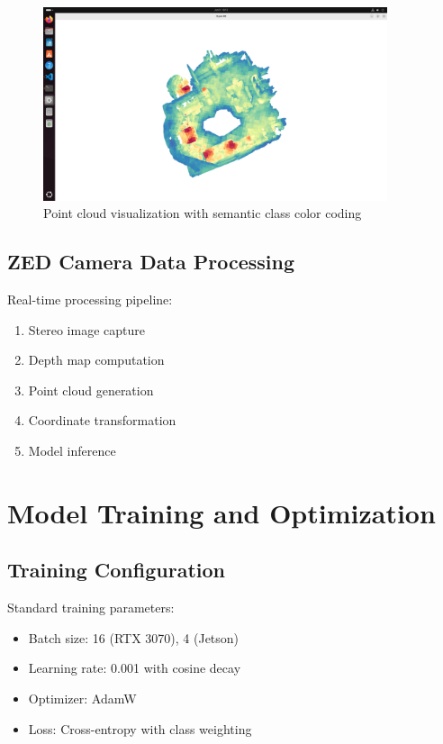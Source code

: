 \documentclass[12pt,a4paper]{report}
\begin{document}
\begin{figure}[htbp]
    \centering
    \includegraphics[width=0.9\textwidth]{figures/pointcloud_visualisation_sonata_demo.png}
    \caption{Point cloud visualization with semantic class color coding}
    \label{fig:point_cloud_visualization}
\end{figure}

\subsection{ZED Camera Data Processing}

Real-time processing pipeline:
\begin{enumerate}
    \item Stereo image capture
    \item Depth map computation
    \item Point cloud generation
    \item Coordinate transformation
    \item Model inference
\end{enumerate}

\section{Model Training and Optimization}

\subsection{Training Configuration}

Standard training parameters:
\begin{itemize}
    \item Batch size: 16 (RTX 3070), 4 (Jetson)
    \item Learning rate: 0.001 with cosine decay
    \item Optimizer: AdamW
    \item Loss: Cross-entropy with class weighting
\end{itemize}
\end{document}
